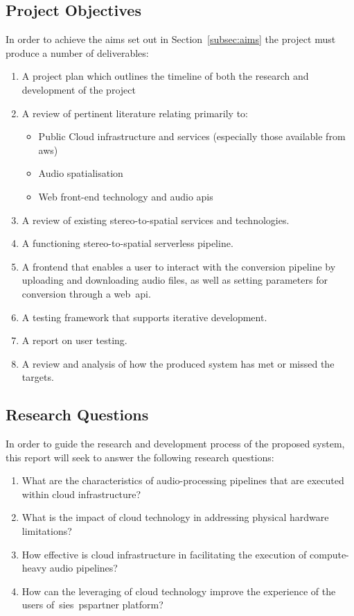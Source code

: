 \subsection{Project Objectives}\label{subsec:project-objectives}

In order to achieve the aims set out in Section~\ref{subsec:aims} the project must produce a number of deliverables:

\begin{enumerate}
    \item A project plan which outlines the timeline of both the research and development of the project
    \item A review of pertinent literature relating primarily to:
    \begin{itemize}
        \item Public Cloud infrastructure and services (especially those available from \gls{aws})
        \item Audio spatialisation
        \item Web front-end technology and audio \glspl{api}
    \end{itemize}
    \item A review of existing stereo-to-spatial services and technologies.
    \item A functioning stereo-to-spatial serverless pipeline.
    \item A frontend that enables a user to interact with the conversion pipeline by uploading and downloading audio files, as well as setting parameters for conversion through a web~\gls{api}.
    \item A testing framework that supports iterative development.
    \item A report on user testing.
    \item A review and analysis of how the produced system has met or missed the targets.
\end{enumerate}

\subsection{Research Questions}\label{subsec:research-questions}

In order to guide the research and development process of the proposed system, this report will seek to answer the following research questions:

\begin{enumerate}
    \item What are the characteristics of audio-processing pipelines that are executed within cloud infrastructure?
    \item What is the impact of cloud technology in addressing physical hardware limitations?
    \item How effective is cloud infrastructure in facilitating the execution of compute-heavy audio pipelines?
    \item How can the leveraging of cloud technology improve the experience of the users of~\glspl{sie}~\gls{pspartner} platform?

\end{enumerate}